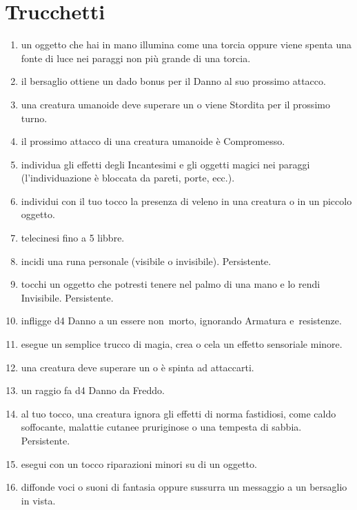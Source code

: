 \documentclass[itdr]{subfiles}
\begin{document}
\section{Trucchetti}
\def \spellcircle {T}
\begin{enumerate}
	\item {} un oggetto che hai in mano illumina come una torcia oppure viene spenta una fonte di luce nei paraggi non più grande di una torcia.
	\item {} il bersaglio ottiene un dado bonus per il Danno al suo prossimo attacco.
	\item {} una creatura umanoide deve superare un  o viene Stordita per il prossimo turno.
	\item {} il prossimo attacco di una creatura umanoide è Compromesso.
	\item {} individua gli effetti degli Incantesimi e gli oggetti magici nei paraggi (l’individuazione è bloccata da pareti, porte, ecc.).
	\item {} individui con il tuo tocco la presenza di veleno in una creatura o in un piccolo oggetto.
	\item {} telecinesi fino a 5 libbre.
	\item {} incidi una runa personale (visibile o invisibile). Persistente.
	\item {} tocchi un oggetto che potresti tenere nel palmo di una mano e lo rendi Invisibile. Persistente.
	\item {} infligge d4 Danno a un essere \mbox{non morto}, ignorando Armatura e~resistenze.
	\item {} esegue un semplice trucco di magia, crea o cela un effetto sensoriale minore.
	\item {} una creatura deve superare un  o è spinta ad attaccarti.
	\item {} un raggio fa d4 Danno da Freddo.
	\item {} al tuo tocco, una creatura ignora gli effetti di norma fastidiosi, come caldo soffocante, malattie cutanee pruriginose o una tempesta di sabbia. Persistente.
	\item {} esegui con un tocco riparazioni minori su di un oggetto.
	\item {} diffonde voci o suoni di fantasia oppure sussurra un messaggio a un bersaglio in vista.

\end{enumerate}
\end{document}
